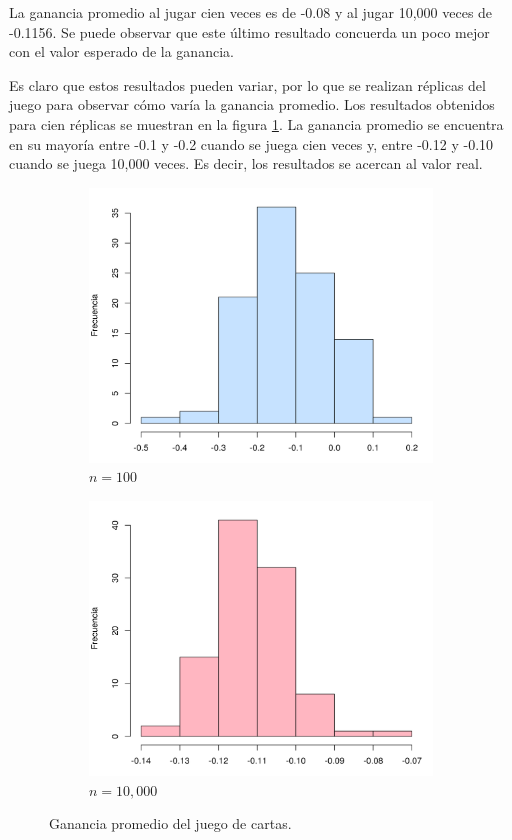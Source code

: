 \documentclass[12pt]{article}
\begin{document}
	La ganancia promedio al jugar cien veces es de -0.08 y al jugar 10,000 veces de -0.1156. Se puede observar que este último resultado concuerda un poco mejor con el valor esperado de la ganancia.

	Es claro que estos resultados pueden variar, por lo que se realizan réplicas del juego para observar cómo varía la ganancia promedio. Los resultados obtenidos para cien réplicas se muestran en la figura \ref{hist_cartas}. La ganancia promedio se encuentra en su mayoría entre -0.1 y -0.2 cuando se juega cien veces y, entre -0.12 y -0.10 cuando se juega 10,000 veces. Es decir, los resultados se acercan al valor real.
	
	\begin{figure}
		\begin{subfigure}{0.5\textwidth}
			\centering
			\includegraphics[scale=0.5]{juego_cartas1.png}
			\caption{$n=100$}
		\end{subfigure}
		\begin{subfigure}{0.5\textwidth}
		\centering
		\includegraphics[scale=0.5]{juego_cartas2.png}
		\caption{$n=10,000$}
	\end{subfigure}
	\caption{Ganancia promedio del juego de cartas.}
	\label{hist_cartas}
	\end{figure}
	
\end{document}
